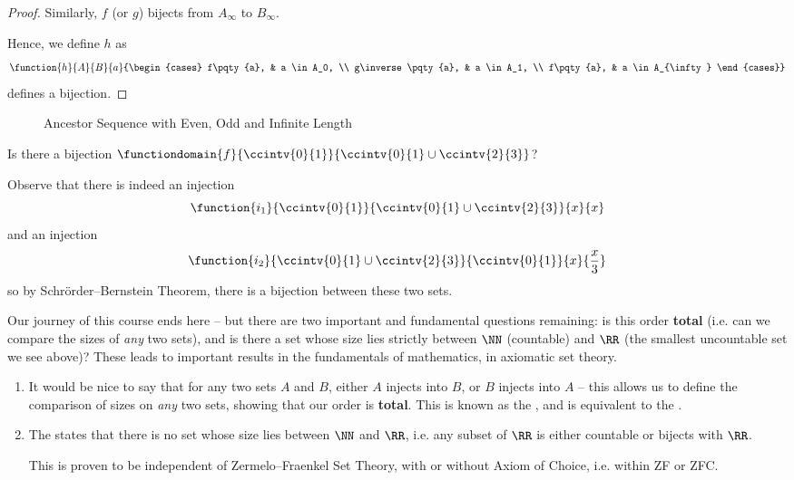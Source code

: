 \begin{proof}
    Similarly, \(f\) (or \(g\)) bijects from \(A_{\infty}\) to \(B{_{\infty}}\).

    Hence, we define \(h\) as
    \[
        \function{h}{A}{B}{a}{\begin{cases}
            f\pqty{a}, & a \in A_0, \\
            g\inverse\pqty{a}, & a \in A_1, \\
            f\pqty{a}, & a \in A_{\infty}
        \end{cases}}
    \]
    defines a bijection.
\end{proof}

\begin{figure}[ht!]
    \centering
    \caption{Ancestor Sequence with Even, Odd and Infinite Length}
    \label{fig:ancestor-sequence-even-odd-infinite-length}
\end{figure}

\begin{example}
    Is there a bijection \(\functiondomain{f}{\ccintv{0}{1}}{\ccintv{0}{1} \cup \ccintv{2}{3}}\)?

    Observe that there is indeed an injection
    \[
        \function{i_1}{\ccintv{0}{1}}{\ccintv{0}{1} \cup \ccintv{2}{3}}{x}{x}
    \]
    and an injection
    \[
        \function{i_2}{\ccintv{0}{1} \cup \ccintv{2}{3}}{\ccintv{0}{1}}{x}{\frac{x}{3}}
    \]
    so by Schr\"{o}rder--Bernstein Theorem, there is a bijection between these two sets.
\end{example}

Our journey of this course ends here -- but there are two important and fundamental questions remaining: is this order \textbf{total} (i.e. can we compare the sizes of \emph{any} two sets), and is there a set whose size lies strictly between \(\NN\) (countable) and \(\RR\) (the smallest uncountable set we see above)? These leads to important results in the fundamentals of mathematics, in axiomatic set theory.

\begin{remarks}
    \begin{enumerate}
        \item It would be nice to say that for any two sets \(A\) and \(B\), either \(A\) injects into \(B\), or \(B\) injects into \(A\) -- this allows us to define the comparison of sizes on \emph{any} two sets, showing that our order is \textbf{total}. This is known as the , and is equivalent to the .
        
        \item The  states that there is no set whose size lies between \(\NN\) and \(\RR\), i.e. any subset of \(\RR\) is either countable or bijects with \(\RR\).
        
        This is proven to be independent of Zermelo--Fraenkel Set Theory, with or without Axiom of Choice, i.e. within ZF or ZFC.
    \end{enumerate}
\end{remarks}